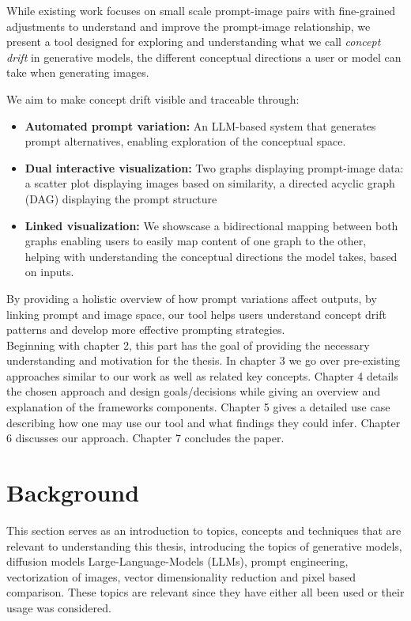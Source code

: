 \documentclass[
  a4paper,  %
  twoside,  %
  bibliography=totoc,
  headsepline,
  cleardoublepage=empty,
  parskip=half,
  draft=false
]{scrbook}
\begin{document}
While existing work focuses on small scale prompt-image pairs with fine-grained adjustments to understand and improve the prompt-image relationship, we present a tool designed for exploring and understanding what we call \textit{concept drift} in generative models, the different conceptual directions a user or model can take when generating images.

We aim to make concept drift visible and traceable through:

\begin{itemize}
	\item \textbf{Automated prompt variation:} An LLM-based system that generates prompt alternatives, enabling exploration of the conceptual space.
	\item \textbf{Dual interactive visualization:} Two graphs displaying prompt-image data: a scatter plot displaying images based on similarity, a directed acyclic graph (DAG) displaying the prompt structure 
	\item \textbf{Linked visualization:} We showscase a bidirectional mapping between both graphs enabling users to easily map content of one graph to the other, helping with understanding the conceptual directions the model takes, based on inputs.
\end{itemize}

By providing a holistic overview of how prompt variations affect outputs, by linking prompt and image space, our tool helps users understand concept drift patterns and develop more effective prompting strategies. \\
Beginning with chapter 2, this part has the goal of providing the necessary understanding and motivation for the thesis. In chapter 3 we go over pre-existing approaches similar to our work as well as related key concepts. Chapter 4 details the chosen approach and design goals/decisions while giving an overview and explanation of the frameworks components. Chapter 5 gives a detailed use case describing how one may use our tool and what findings they could infer. Chapter 6 discusses our approach. Chapter 7 concludes the paper.

\chapter{Background}
\label{chap:k2}
This section serves as an introduction to topics, concepts and techniques that are relevant to understanding this thesis, introducing the topics of generative models, diffusion models Large-Language-Models (LLMs), prompt engineering, vectorization of images, vector dimensionality reduction and pixel based comparison. These topics are relevant since they have either all been used or their usage was considered.
\end{document}
